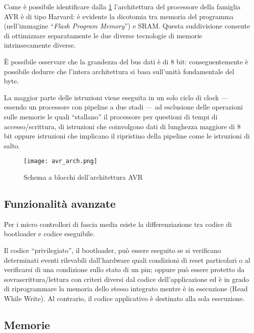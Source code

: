 Come è possibile identificare dalla \cref{fig:avr-arch} l'architettura del processore della famiglia AVR è di tipo Harvard: è evidente la dicotomia tra memoria del programma (nell'immagine ``\textit{Flash Program Memory}'') e SRAM\cite{harvard-arch}. Questa suddivisione consente di ottimizzare separatamente le due diverse tecnologie di memorie intrinsecamente diverse.

È possibile osservare che la grandezza del bus dati è di 8 bit: conseguentemente è possibile dedurre che l'intera architettura si basa sull'unità fondamentale del byte.

La maggior parte delle istruzioni viene eseguita in un solo ciclo di clock\cite[sec 7.6]{avr:m328p} --- essendo un processore con pipeline a due stadi --- ad esclusione delle operazioni sulle memorie le quali ``stallano'' il processore per questioni di tempi di accesso/scrittura, di istruzioni che coinvolgono dati di lunghezza maggiore di 8 bit oppure istruzioni che implicano il ripristino della pipeline come le istruzioni di salto.

\begin{figure}[t]
    \centering
    \texttt{[image: avr\_arch.png]}
    \caption[Immagine ottenuta dal documento~\cite{avr:m328p} fig 7-1]{Schema a blocchi dell'architettura AVR\cite[fig 7-1]{avr:m328p}}\label{fig:avr-arch}
\end{figure}

\subsection{Funzionalità avanzate}\label{ss:advanced-features}

Per i micro controllori di fascia media esiste la differenziazione tra codice di bootloader e codice eseguibile.

Il codice ``privilegiato'', il bootloader, può essere eseguito se si verificano determinati eventi rilevabili dall'hardware quali condizioni di reset particolari o al verificarsi di una condizione sullo stato di un pin; oppure può essere protetto da sovrascrittura/lettura con criteri diversi dal codice dell'applicazione ed è in grado di riprogrammare la memoria dello stesso integrato mentre è in esecuzione (Read While Write)\cite[sec 27.4]{avr:m328p}. Al contrario, il codice applicativo è destinato alla sola esecuzione.

\subsection{Memorie}

